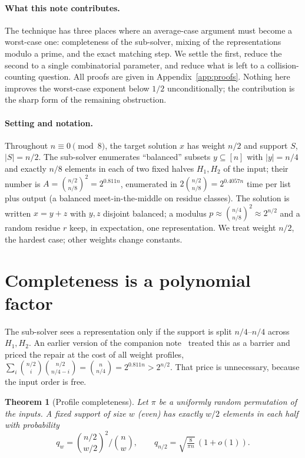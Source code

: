 \documentclass[conference]{IEEEtran}
\newtheorem{theorem}{Theorem}
\begin{document}
\paragraph*{What this note contributes.}
The technique has three places where an average-case argument must become a
worst-case one: completeness of the sub-solver, mixing of the representations
modulo a prime, and the exact matching step. We settle the first, reduce the
second to a single combinatorial parameter, and reduce what is left to a
collision-counting question. All proofs are given in Appendix~\ref{app:proofs}.
Nothing here improves the worst-case exponent below $1/2$ unconditionally; the
contribution is the sharp form of the remaining obstruction.

\paragraph*{Setting and notation.}
Throughout $n\equiv 0\pmod 8$, the target solution $x$ has weight $n/2$ and support
$S$, $|S|=n/2$. The sub-solver enumerates ``balanced'' subsets
$y\subseteq[n]$ with $|y|=n/4$ and exactly $n/8$ elements in each of two fixed halves
$H_1,H_2$ of the input; their number is
$A=\binom{n/2}{n/8}^2=2^{0.811n}$, enumerated in
$2\binom{n/2}{n/8}=2^{0.4057n}$ time per list plus output
(a balanced meet-in-the-middle on residue classes). The solution is
written $x=y+z$ with $y,z$ disjoint balanced; a modulus $p\approx\binom{n/4}{n/8}^2\approx 2^{n/2}$
and a random residue $r$ keep, in expectation, one representation.
We treat weight $n/2$, the hardest case; other weights change constants.

\section{Completeness is a polynomial factor}\label{sec:profile}
The sub-solver sees a representation only if the support is split $n/4$--$n/4$
across $H_1,H_2$. An earlier version of the companion note~\cite{mixing} treated this
as a barrier and priced the repair at the cost of all weight profiles,
$\sum_i\binom{n/2}{i}\binom{n/2}{n/4-i}=\binom{n}{n/4}=2^{0.811n}>2^{n/2}$. That
price is unnecessary, because the input order is free.

\begin{theorem}[Profile completeness]\label{thm:profile}
Let $\pi$ be a uniformly random permutation of the inputs. A fixed support of
size $w$ (even) has exactly $w/2$ elements in each half with probability
\[
q_w=\binom{n/2}{w/2}^2\Big/\binom{n}{w},\qquad
q_{n/2}=\sqrt{\tfrac{8}{\pi n}}\,(1+o(1)).
\]
\end{theorem}
\end{document}
